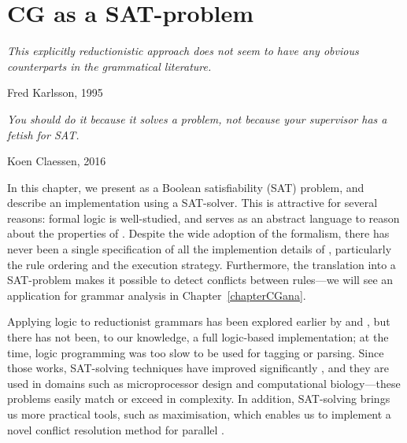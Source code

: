 \def\la{\text{\em la}}
\def\casa{\text{\em casa}}
\def\grande{\text{\em grande}}

\def\det{{\text{\sc Det}}}
\def\prn{{\text{\sc  Prn}}}
\def\n{{\text{\sc N}}}
\def\v{{\text{\sc V}}}
\def\adj{{\text{\sc Adj}}}

\def\laDet{\la_\det}
\def\laPrn{\la_\prn}
\def\casaN{\casa_\n}
\def\casaV{\casa_\v}
\def\grandeAdj{\grande_\adj}

\def\t#1{\texttt{#1}}
\def\ob#1{\overbrace{ #1 \rule{0pt}{2ex}}}
\def\cgrule#1{{\ttfamily #1}}

\def\defRule{``do not remove the last reading''}

\chapter{CG as a SAT-problem}
\label{chapterCGSAT}

\epigraph{\it This explicitly reductionistic approach does not seem to
  have any obvious counterparts in the grammatical literature.}{Fred Karlsson, 1995}


\epigraph{\it You should do it because it solves a problem, not because your supervisor has a fetish for SAT.}{Koen Claessen, 2016}


In this chapter, we present \onlycg{} as a Boolean satisfiability
(SAT) problem, and describe an implementation using a SAT-solver.
This is attractive for several reasons: formal logic is well-studied,
and serves as an abstract language to reason about the properties of
\onlycg{}. Despite the wide adoption of the formalism, there has never
been a single specification of all the implemention details of
\onlycg{}, particularly the rule ordering and the execution
strategy. Furthermore, the translation into a SAT-problem makes it
possible to detect conflicts between rules---we will see an
application for grammar analysis in Chapter~\ref{chapterCGana}.

Applying logic to reductionist grammars has been explored earlier by
\citet{lager98} and \citet{lager_nivre01}, but there has not been, to
our knowledge, a full logic-based \onlycg{} implementation; at the
time, logic programming was too slow to be used for tagging or
parsing.  Since those works, SAT-solving techniques have improved
significantly \cite{marques_silva2010}, and they are used in domains
such as microprocessor design and computational biology---these
problems easily match or exceed \onlycg{} in complexity.  In addition,
SAT-solving brings us more practical tools, such as maximisation,
which enables us to implement a novel conflict resolution method for
parallel \onlycg{}.

